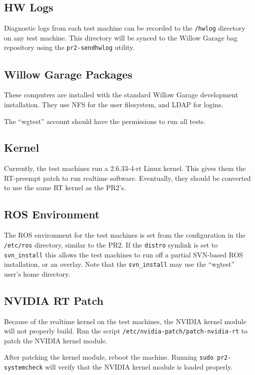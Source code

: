 \documentclass[11pt]{report}
\begin{document}
\subsection{HW Logs}

Diagnostic logs from each test machine can be recorded to the \texttt{/hwlog} directory on any test machine. This directory will be synced to the Willow Garage bag repository using the \texttt{pr2-sendhwlog} utility. 

\subsection{Willow Garage Packages}

These computers are installed with the standard Willow Garage development installation. They use NFS for the user filesystem, and LDAP for logins. 

The ``wgtest'' account should have the permissions to run all tests.

\subsection{Kernel}

Currently, the test machines run a 2.6.33-4-rt Linux kernel. This gives them the RT-preempt patch to run realtime software. Eventually, they should be converted to use the same RT kernel as the PR2's.

\subsection{ROS Environment}

The ROS environment for the test machines is set from the configuration in the \texttt{/etc/ros} directory, similar to the PR2. If the \texttt{distro} symlink is set to \texttt{svn\_install} this allows the test machines to run off a partial SVN-based ROS installation, or an overlay. Note that the \texttt{svn\_install} may use the ``wgtest'' user's home directory.

\subsection{NVIDIA RT Patch}

Because of the realtime kernel on the test machines, the NVIDIA kernel module will not properly build. Run the script \texttt{/etc/nvidia-patch/patch-nvidia-rt} to patch the NVIDIA kernel module.

After patching the kernel module, reboot the machine. Running \texttt{sudo pr2-systemcheck} will verify that the NVIDIA kernel module is loaded properly.
\end{document}
